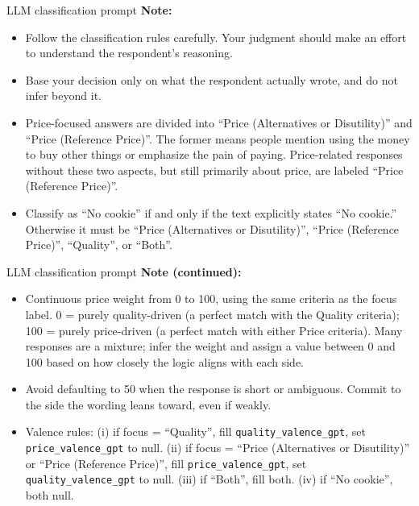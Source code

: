 \documentclass[10pt]{beamer}   %
\begin{document}
\begin{frame}{LLM classification prompt}
\small
\textbf{Note:}

\begin{itemize}
\item Follow the classification rules carefully. Your judgment should make an effort to understand the respondent's reasoning.
\item Base your decision only on what the respondent actually wrote, and do not infer beyond it.
\item Price-focused answers are divided into ``Price (Alternatives or Disutility)'' and ``Price (Reference Price)''. The former means people mention using the money to buy other things or emphasize the pain of paying. Price-related responses without these two aspects, but still primarily about price, are labeled ``Price (Reference Price)''.
\item Classify as ``No cookie'' if and only if the text explicitly states ``No cookie.'' Otherwise it must be ``Price (Alternatives or Disutility)'', ``Price (Reference Price)'', ``Quality'', or ``Both''.
\end{itemize}
\end{frame}

\begin{frame}{LLM classification prompt}
\small
\textbf{Note (continued):}

\begin{itemize}
\item Continuous price weight from 0 to 100, using the same criteria as the focus label. 0 = purely quality-driven (a perfect match with the Quality criteria); 100 = purely price-driven (a perfect match with either Price criteria). Many responses are a mixture; infer the weight and assign a value between 0 and 100 based on how closely the logic aligns with each side.
\item Avoid defaulting to 50 when the response is short or ambiguous. Commit to the side the wording leans toward, even if weakly.
\item Valence rules: (i) if focus = ``Quality'', fill \texttt{quality\_valence\_gpt}, set \texttt{price\_valence\_gpt} to null. (ii) if focus = ``Price (Alternatives or Disutility)'' or ``Price (Reference Price)'', fill \texttt{price\_valence\_gpt}, set \texttt{quality\_valence\_gpt} to null. (iii) if ``Both'', fill both. (iv) if ``No cookie'', both null.
\end{itemize}
\end{frame}
\end{document}
